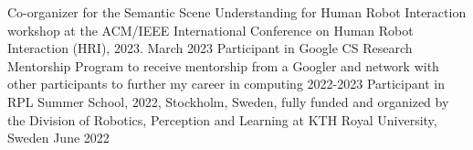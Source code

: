 \begin{cvhonors}
 \cvhonor
    {Co-organizer for the Semantic Scene Understanding for Human Robot Interaction workshop at the ACM/IEEE International Conference on Human Robot Interaction (HRI), 2023.} %
    {March 2023} %
    \vspace{-1mm}
 \cvhonor
    {Participant in Google CS Research Mentorship Program to receive mentorship from a Googler and network with other participants to further my career in computing} %
    {2022-2023} %
    \vspace{-1mm}
  \cvhonor
    {Participant in RPL Summer School, 2022, Stockholm, Sweden, fully funded and organized by the Division of Robotics, Perception and Learning at KTH Royal University, Sweden} %
    {June 2022} %

\end{cvhonors}
